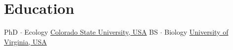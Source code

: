 \documentclass[letterpaper]{twentysecondcv} %
\begin{document}
\pagecolor{white} %
\makeprofile %

\section{Education}
\begin{twenty} %
        		{PhD $\cdot$ Ecology}
        		{\href{http://www.colostate.edu/}{Colorado State University, USA}}{}{}
        		{BS $\cdot$ Biology}
       		{\href{http://www.virginia.edu/}{University of Virginia, USA}}{}{}
\end{twenty}

\end{document}
